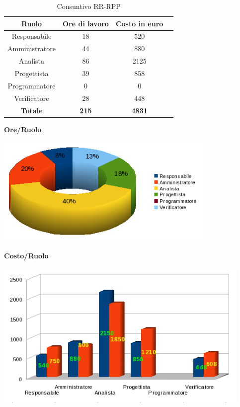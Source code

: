 \begin{table}[h]
	\begin{center}
		  \begin{tabular}{|c|c|c|c|}
		 \hline 
		 \textbf{Ruolo} & \textbf{Ore di lavoro} & \textbf{Costo in euro}\\
		 \hline
		Responsabile & 18 & 520 \\
		Amministratore & 44 & 880\\
		Analista & 86 & 2125\\
		Progettista & 39 & 858\\
		Programmatore & 0 & 0 \\
		Verificatore & 28 & 448\\
        \hline
        \textbf{Totale} & \textbf{215} & \textbf{4831}\\
		\hline
		\end{tabular}
	\caption{Consuntivo RR-RPP} 
	\label{tab:cons_RR-RPP}
	\end{center}	
\end{table}

\begin{center}\textbf{Ore/Ruolo}
\end{center}
\includegraphics[width=300pt]{Cons-RR-RPP2}
\newpage

\begin{center}\textbf{Costo/Ruolo}
\end{center}
\includegraphics[width=350pt]{Cons-RR-RPP1}


